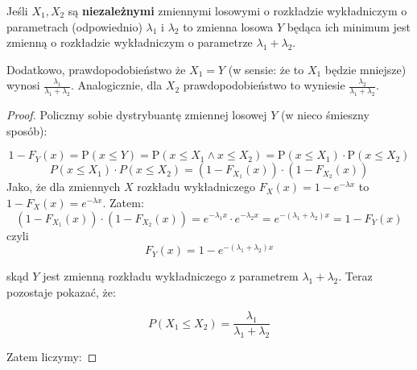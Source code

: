 \begin{theorem}[Lemat 8.5 P\&C]
\label{lemat8.5}
Jeśli \(X_1, X_2\) są \textbf{niezależnymi} zmiennymi losowymi o rozkładzie wykładniczym o parametrach (odpowiednio) \(\lambda_1\) i \(\lambda_2\) to zmienna losowa \(Y\) będąca ich minimum jest zmienną o rozkładzie wykładniczym o parametrze \( \lambda_1 + \lambda_2 \).
    
Dodatkowo, prawdopodobieństwo że \(X_1 = Y\) (w sensie: że to \(X_1\) będzie mniejsze) wynosi \( \frac{\lambda_1}{\lambda_1 + \lambda_2} \). Analogicznie, dla \(X_2\) prawdopodobieństwo to wyniesie \( \frac{\lambda_2}{\lambda_1 + \lambda_2} \).
\end{theorem}

\begin{proof}
    Policzmy sobie dystrybuantę zmiennej losowej \(Y\) (w nieco śmieszny sposób): 
    
    \[ 
        1 - F_Y(x) = \mathrm{P}(x \leq Y) = \mathrm{P}(x \leq X_1 \land x \leq X_2) = \mathrm{P}(x \leq X_1) \cdot \mathrm{P}(x \leq X_2) 
    \]
    \[ 
        P(x \leq X_1) \cdot P(x \leq X_2) = (1 - F_{X_1}(x)) \cdot (1 - F_{X_2}(x))
    \]
    Jako, że dla zmiennych \(X\) rozkładu wykładniczego \(F_{X}(x) = 1 - e^{- \lambda x}\) to \(1 - F_{X}(x) = e^{-\lambda x}\). Zatem:
    \[
    (1 - F_{X_1}(x)) \cdot (1 - F_{X_2}(x)) = e^{-\lambda_1 x} \cdot e^{-\lambda_2 x} = e^{-(\lambda_1 + \lambda_2)x} = 1 - F_Y(x)
    \]
    czyli 
    \[ 
        F_Y(x) = 1 - e^{-(\lambda_1 + \lambda_2)x}
    \]
    
    skąd \(Y\) jest zmienną rozkładu wykładniczego z parametrem \( \lambda_1 + \lambda_2\). Teraz pozostaje pokazać, że:
    
    \[
        P(X_1 \leq X_2) = \frac{\lambda_1}{\lambda_1 + \lambda_2}
    \]
    
    Zatem liczymy:
    

\end{proof}
